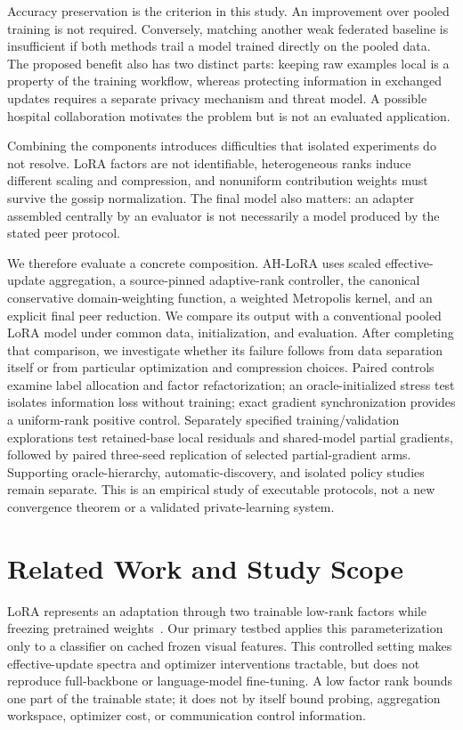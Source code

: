\documentclass[11pt]{article}
\begin{document}
Accuracy preservation is the criterion in this study. An improvement over pooled training is not required. Conversely, matching another weak federated baseline is insufficient if both methods trail a model trained directly on the pooled data. The proposed benefit also has two distinct parts: keeping raw examples local is a property of the training workflow, whereas protecting information in exchanged updates requires a separate privacy mechanism and threat model. A possible hospital collaboration motivates the problem but is not an evaluated application.

Combining the components introduces difficulties that isolated experiments do not resolve. LoRA factors are not identifiable, heterogeneous ranks induce different scaling and compression, and nonuniform contribution weights must survive the gossip normalization. The final model also matters: an adapter assembled centrally by an evaluator is not necessarily a model produced by the stated peer protocol.

We therefore evaluate a concrete composition. AH-LoRA uses scaled effective-update aggregation, a source-pinned adaptive-rank controller, the canonical conservative domain-weighting function, a weighted Metropolis kernel, and an explicit final peer reduction. We compare its output with a conventional pooled LoRA model under common data, initialization, and evaluation. After completing that comparison, we investigate whether its failure follows from data separation itself or from particular optimization and compression choices. Paired controls examine label allocation and factor refactorization; an oracle-initialized stress test isolates information loss without training; exact gradient synchronization provides a uniform-rank positive control. Separately specified training/validation explorations test retained-base local residuals and shared-model partial gradients, followed by paired three-seed replication of selected partial-gradient arms. Supporting oracle-hierarchy, automatic-discovery, and isolated policy studies remain separate. This is an empirical study of executable protocols, not a new convergence theorem or a validated private-learning system.

\section{Related Work and Study Scope}
LoRA represents an adaptation through two trainable low-rank factors while freezing pretrained weights~\citep{hu2022lora}. Our primary testbed applies this parameterization only to a classifier on cached frozen visual features. This controlled setting makes effective-update spectra and optimizer interventions tractable, but does not reproduce full-backbone or language-model fine-tuning. A low factor rank bounds one part of the trainable state; it does not by itself bound probing, aggregation workspace, optimizer cost, or communication control information.
\end{document}
